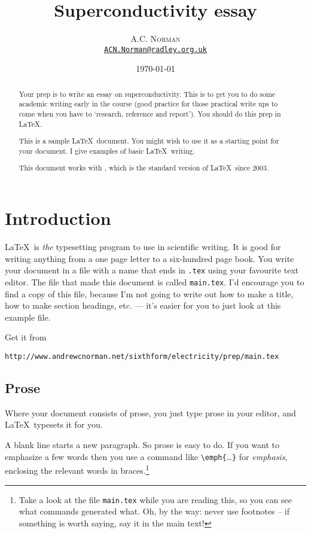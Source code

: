 \documentclass[12pt]{article}
\title{Superconductivity essay}
\author{\textsc{A.C. Norman}
\\ \href{mailto:ACN.Norman@radley.org.uk}{\texttt{ACN.Norman@radley.org.uk}} }
\date{\today}
\begin{document}
\maketitle

\begin{abstract}

Your prep is to write an essay on superconductivity.  This is to get you to do some academic writing early in the course (good practice for those practical write ups to come when you have to `research, reference and report').  You should do this prep in \LaTeX .
    
This is a sample \LaTeX\ document. You might wish to use it as a starting point for your document. I give examples of basic \LaTeX\ writing.

This document works with \LaTeXe , which is the standard version of \LaTeX\ since 2003.

\end{abstract}

\section{Introduction}

\LaTeX\ is {\em the} typesetting program to use in scientific writing.
It is good for writing anything from a one page letter to a six-hundred page book.
You write your document in a file with a name that ends in {\tt .tex} using your favourite text editor. 
The file that made this document is called {\tt main.tex}.  I'd encourage you to find a copy of this file, because I'm not going to write out how to make a title, how to make section headings, etc. --- it's easier for you to just look at this example file.
 
Get it from
\begin{center}
  {\tt{http://www.andrewcnorman.net/sixthform/electricity/prep/main.tex}}
\end{center}

\subsection{Prose}

Where your document consists of prose, you just type prose in your
editor, and \LaTeX\ typesets it for you.

A blank line starts a new paragraph. So prose is easy to do. If you
want to emphasize a few words then you use a command like
\verb+\emph{+\ldots\verb+}+ for \emph{emphasis}, enclosing the relevant words
in braces.\footnote{
\label{that_one} 
Take a look at the file {\tt main.tex} while you are reading this, 
so you can see what commands generated what.
Oh, by the way: never use footnotes -- if something is worth saying,
say it in the main text!
}
%
%
%
\label{blank_line}
\end{document}
